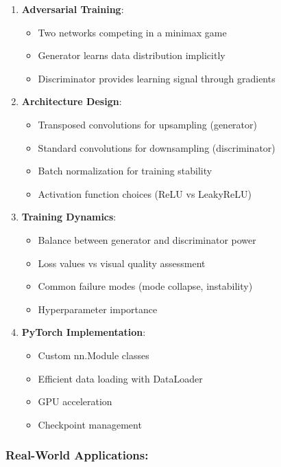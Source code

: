 \documentclass[11pt]{article}
\providecommand{\tightlist}{%
      \setlength{\itemsep}{0pt}\setlength{\parskip}{0pt}}
\begin{document}
\begin{enumerate}
\def\labelenumi{\arabic{enumi}.}
\tightlist
\item
  \textbf{Adversarial Training}:

  \begin{itemize}
  \tightlist
  \item
    Two networks competing in a minimax game
  \item
    Generator learns data distribution implicitly
  \item
    Discriminator provides learning signal through gradients
  \end{itemize}
\item
  \textbf{Architecture Design}:

  \begin{itemize}
  \tightlist
  \item
    Transposed convolutions for upsampling (generator)
  \item
    Standard convolutions for downsampling (discriminator)
  \item
    Batch normalization for training stability
  \item
    Activation function choices (ReLU vs LeakyReLU)
  \end{itemize}
\item
  \textbf{Training Dynamics}:

  \begin{itemize}
  \tightlist
  \item
    Balance between generator and discriminator power
  \item
    Loss values vs visual quality assessment
  \item
    Common failure modes (mode collapse, instability)
  \item
    Hyperparameter importance
  \end{itemize}
\item
  \textbf{PyTorch Implementation}:

  \begin{itemize}
  \tightlist
  \item
    Custom nn.Module classes
  \item
    Efficient data loading with DataLoader
  \item
    GPU acceleration
  \item
    Checkpoint management
  \end{itemize}
\end{enumerate}

\subsubsection{Real-World Applications:}\label{real-world-applications}
\end{document}
